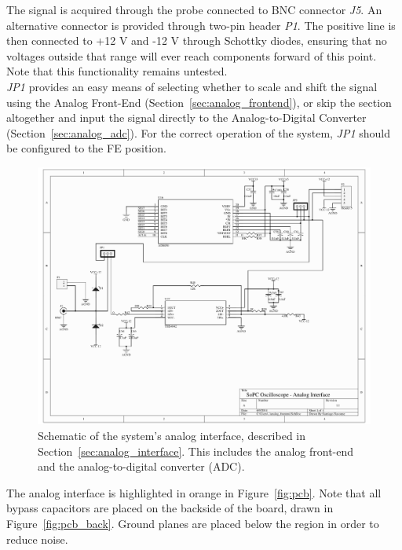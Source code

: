 \documentclass[titlepage]{scrartcl}
\begin{document}
	The signal is acquired through the probe connected to BNC connector \textit{J5}. An alternative connector is provided through two-pin header \textit{P1}. The positive line is then connected to +12 V and -12 V through Schottky diodes, ensuring that no voltages outside that range will ever reach components forward of this point. Note that this functionality remains untested.\\

	\textit{JP1} provides an easy means of selecting whether to scale and shift the signal using the Analog Front-End (Section~\ref{sec:analog_frontend}), or skip the section altogether and input the signal directly to the Analog-to-Digital Converter (Section~\ref{sec:analog_adc}). For the correct operation of the system, \textit{JP1} should be configured to the FE position.\\

	\begin{figure}[h!]
	\vspace{-2cm}
	\centerline{\includegraphics[width=26cm, angle=90, origin=c]{img/analog_interface.pdf}}
                	\caption{Schematic of the system's analog interface, described in Section~\ref{sec:analog_interface}. This includes the analog front-end and the analog-to-digital converter (ADC).}
               	\label{fig:analog_interface}
	\end{figure}

	The analog interface is highlighted in orange in Figure~\ref{fig:pcb}. Note that all bypass capacitors are placed on the backside of the board, drawn in Figure~\ref{fig:pcb_back}. Ground planes are placed below the region in order to reduce noise.\\
\end{document}
